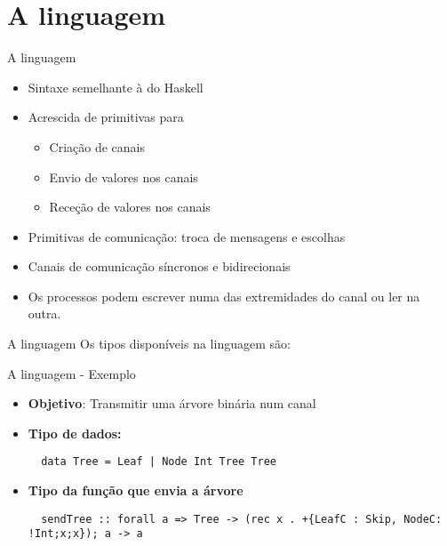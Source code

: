 \section{A linguagem}

\begin{frame}[fragile]{A linguagem}

  \begin{itemize}
  \item Sintaxe semelhante à do Haskell
  \newline
  \item Acrescida de primitivas para
    \begin{itemize}
    \item Criação de canais
    \item Envio de valores nos canais
    \item Receção de valores nos canais
    \end{itemize}
 
  \item Primitivas de comunicação: troca de mensagens e escolhas
  \newline
  \item Canais de comunicação síncronos e bidirecionais
  \newline
  \item Os processos podem escrever numa das extremidades do canal ou ler na outra.
  \end{itemize}  
\end{frame}

\begin{frame}[fragile]{A linguagem}
  Os tipos disponíveis na linguagem são:
    
\end{frame}

\lstset{language=CFST, style=eclipse, frame=none, numbers=none}
\begin{frame}[fragile]{A linguagem - Exemplo}
  \begin{itemize}
  \item \textbf{Objetivo}: Transmitir uma árvore binária num canal
    \newline
  \item \textbf{Tipo de dados:}
\begin{lstlisting}
  data Tree = Leaf | Node Int Tree Tree
\end{lstlisting}

  \item \textbf{Tipo da função que envia a árvore}
\begin{lstlisting}
  sendTree :: forall a => Tree -> (rec x . +{LeafC : Skip, NodeC: !Int;x;x}); a -> a
\end{lstlisting}
  \end{itemize}
\end{frame}

